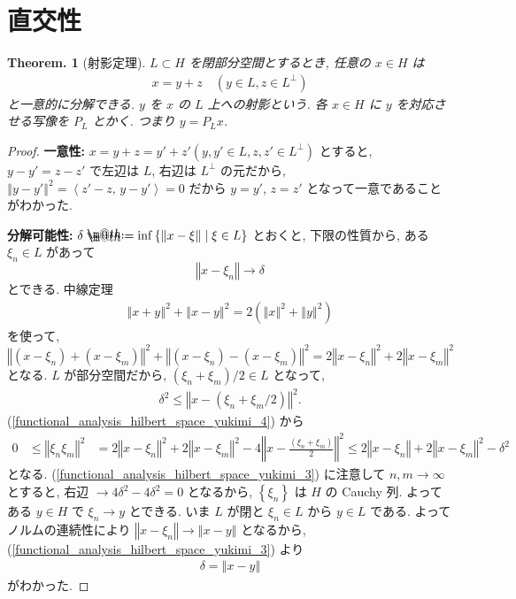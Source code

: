 \documentclass[openany, a4paper, oneside]{jsbook}
\makeatletter
\newcommand*{\defeq}{\mathrel{\rlap{%
\raisebox{0.3ex}{$\m@th\cdot$}}%
\raisebox{-0.3ex}{$\m@th\cdot$}}%
=}
\theoremstyle{break}
\newtheorem{thm}{Theorem.}[section]
\theoremstyle{breakdefn}
\newcommand{\norm}[1]{\left\Vert#1\right\Vert}
\newcommand{\rbk}[1]{\left (#1\right)}
\newcommand{\cbk}[1]{\left\{#1\right\}}
\newcommand{\bkt}[2]{\left\langle#1,\,#2\right\rangle}
\newcommand{\relmiddle}[1]{\mathrel{}\middle#1\mathrel{}}
\newcommand{\set}[2]{\left\{#1 \relmiddle| #2\right\}}
\makeatother
\begin{document}
\section{直交性}


\begin{thm}[射影定理]
 $L \subset H$ を閉部分空間とするとき, 任意の $x \in H$ は
 \begin{align}
  x
  =
  y + z \quad (y \in L, z \in L^{\perp})
 \end{align}
 と一意的に分解できる.
 $y$ を $x$ の $L$ 上への射影という.
 各 $x \in H$ に $y$ を対応させる写像を $P_{L}$ とかく.
 つまり $y = P_{L}x$.
\end{thm}
\begin{proof}
\textbf{一意性:}
$x = y + z = y' + z' (y, y'\in L, z, z'\in L^{\perp})$ とすると,
$y - y' = z - z'$ で左辺は $L$, 右辺は $L^{\perp}$ の元だから,
$\norm{y - y'}^2 = \bkt{z' - z}{y - y'} = 0$ だから $y = y' $, $z = z'$ となって一意であることがわかった.

\textbf{分解可能性:}
$\delta \defeq \inf \set{\norm{x - \xi}}{\xi \in L}$ とおくと,
下限の性質から, ある $\xi_{n} \in L$ があって
\begin{equation}
 \norm{x - \xi_n}
 \longrightarrow
 \delta \label{functional_analysis_hilbert_space_yukimi_3}
\end{equation}
とできる.
中線定理
\begin{align}
 \norm{x + y}^2 + \norm{x - y}^2
 =
 2 \rbk{\norm{x}^2 + \norm{y}^2}
\end{align}
を使って,
\begin{equation}
 \norm{\rbk{x - \xi_n} + \rbk{x - \xi_m}}^2 + \norm{\rbk{x - \xi_n} - \rbk{x - \xi_m}}^2
 =
 2 \norm{x - \xi_n}^2 + 2 \norm{x - \xi_m}^2 \label{functional_analysis_hilbert_space_yukimi_4}
\end{equation}
となる.
$L$ が部分空間だから, $\rbk{\xi_{n} + \xi_{m}} / 2 \in L$ となって,
\begin{align}
 \delta^2
 \leq
 \norm{x - \rbk{\xi_{n} + \xi_{m}/2}}^2.
\end{align}
(\ref{functional_analysis_hilbert_space_yukimi_4}) から
\begin{align}
 0
 &\leq
 \norm{\xi_n \xi_m}^2
 &=
 2 \norm{x - \xi_n}^2 + 2 \norm{x - \xi_m}^2 - 4 \norm{x - \frac{\rbk{\xi_n + \xi_m}}{2}}^2
 \leq
 2 \norm{x - \xi_n} + 2 \norm{x - \xi_m}^2 - \delta^2
\end{align}
となる.
(\ref{functional_analysis_hilbert_space_yukimi_3}) に注意して
$n, m \to \infty$ とすると,
右辺 $\to 4 \delta^2 - 4\delta^2 = 0$ となるから,
$\cbk{\xi_{n}}$ は $H$ の Cauchy 列.
よってある $y \in H$ で $\xi_{n} \to y$ とできる.
いま $L$ が閉と $\xi_{n} \in L$ から $y \in L$ である.
よってノルムの連続性により $\norm{x - \xi_{n}} \to \norm{x - y}$ となるから,
(\ref{functional_analysis_hilbert_space_yukimi_3}) より
\begin{align}
 \delta
 =
 \norm{x - y}
\end{align}
がわかった.


\end{proof}
\end{document}
